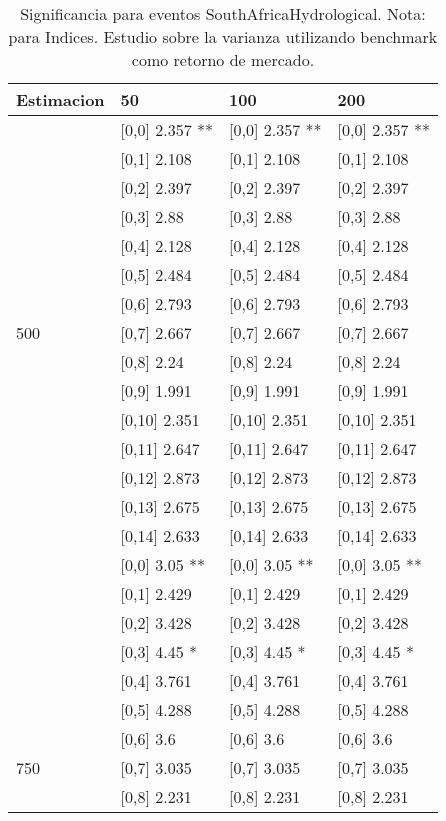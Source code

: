 \begin{table}

\caption{Significancia para eventos SouthAfricaHydrological. Nota: para Indices. Estudio sobre la varianza utilizando benchmark como retorno de mercado.}
\centering
\begin{tabular}[t]{llll}
\toprule
Estimacion & 50 & 100 & 200\\
\midrule
 & {}[0,0] 2.357 ** & {}[0,0] 2.357 ** & {}[0,0] 2.357 **\\
 & {}[0,1] 2.108 & {}[0,1] 2.108 & {}[0,1] 2.108\\
 & {}[0,2] 2.397 & {}[0,2] 2.397 & {}[0,2] 2.397\\
 & {}[0,3] 2.88 & {}[0,3] 2.88 & {}[0,3] 2.88\\
 & {}[0,4] 2.128 & {}[0,4] 2.128 & {}[0,4] 2.128\\
\addlinespace
 & {}[0,5] 2.484 & {}[0,5] 2.484 & {}[0,5] 2.484\\
 & {}[0,6] 2.793 & {}[0,6] 2.793 & {}[0,6] 2.793\\
500 & {}[0,7] 2.667 & {}[0,7] 2.667 & {}[0,7] 2.667\\
 & {}[0,8] 2.24 & {}[0,8] 2.24 & {}[0,8] 2.24\\
 & {}[0,9] 1.991 & {}[0,9] 1.991 & {}[0,9] 1.991\\
\addlinespace
 & {}[0,10] 2.351 & {}[0,10] 2.351 & {}[0,10] 2.351\\
 & {}[0,11] 2.647 & {}[0,11] 2.647 & {}[0,11] 2.647\\
 & {}[0,12] 2.873 & {}[0,12] 2.873 & {}[0,12] 2.873\\
 & {}[0,13] 2.675 & {}[0,13] 2.675 & {}[0,13] 2.675\\
 & {}[0,14] 2.633 & {}[0,14] 2.633 & {}[0,14] 2.633\\
\addlinespace
 & {}[0,0] 3.05 ** & {}[0,0] 3.05 ** & {}[0,0] 3.05 **\\
 & {}[0,1] 2.429 & {}[0,1] 2.429 & {}[0,1] 2.429\\
 & {}[0,2] 3.428 & {}[0,2] 3.428 & {}[0,2] 3.428\\
 & {}[0,3] 4.45 * & {}[0,3] 4.45 * & {}[0,3] 4.45 *\\
 & {}[0,4] 3.761 & {}[0,4] 3.761 & {}[0,4] 3.761\\
\addlinespace
 & {}[0,5] 4.288 & {}[0,5] 4.288 & {}[0,5] 4.288\\
 & {}[0,6] 3.6 & {}[0,6] 3.6 & {}[0,6] 3.6\\
750 & {}[0,7] 3.035 & {}[0,7] 3.035 & {}[0,7] 3.035\\
 & {}[0,8] 2.231 & {}[0,8] 2.231 & {}[0,8] 2.231\\

\end{tabular}
\end{table}
